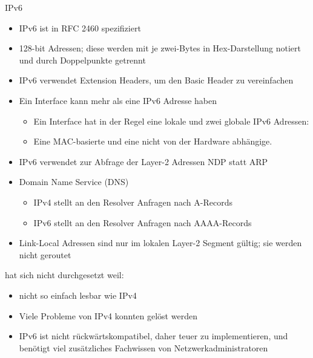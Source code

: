 \begin{definition}{IPv6}
    \begin{itemize}
        \item IPv6 ist in RFC 2460 spezifiziert
        \item 128-bit Adressen; diese werden mit je zwei-Bytes in Hex-Darstellung notiert und durch Doppelpunkte getrennt
        \item IPv6 verwendet Extension Headers, um den Basic Header zu vereinfachen
        \item Ein Interface kann mehr als eine IPv6 Adresse haben
        \begin{itemize}
            \item Ein Interface hat in der Regel eine lokale und zwei globale IPv6 Adressen:
            \item Eine MAC-basierte und eine nicht von der Hardware abhängige.
        \end{itemize}
        \item IPv6 verwendet zur Abfrage der Layer-2 Adressen NDP statt ARP
        \item Domain Name Service (DNS)
        \begin{itemize}
            \item IPv4 stellt an den Resolver Anfragen nach A-Records
            \item IPv6 stellt an den Resolver Anfragen nach AAAA-Records
        \end{itemize}
        \item Link-Local Adressen sind nur im lokalen Layer-2 Segment gültig; sie werden nicht geroutet
    \end{itemize}
    hat sich nicht durchgesetzt weil:
    \begin{itemize}
        \item nicht so einfach lesbar wie IPv4
        \item Viele Probleme von IPv4 konnten gelöst werden
        \item IPv6 ist nicht rückwärtskompatibel, daher teuer zu implementieren, und benötigt viel zusätzliches Fachwissen von Netzwerkadministratoren
    \end{itemize}
\end{definition}

